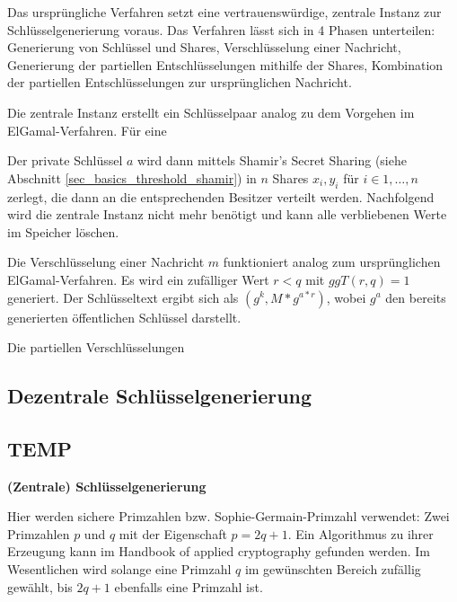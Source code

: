Das ursprüngliche Verfahren setzt eine vertrauenswürdige, zentrale Instanz zur Schlüsselgenerierung voraus. Das Verfahren lässt sich in 4 Phasen unterteilen: Generierung von Schlüssel und Shares, Verschlüsselung einer Nachricht, Generierung der partiellen Entschlüsselungen mithilfe der Shares, Kombination der partiellen Entschlüsselungen zur ursprünglichen Nachricht. 


Die zentrale Instanz erstellt ein Schlüsselpaar analog zu dem Vorgehen im ElGamal-Verfahren. Für eine 

Der private Schlüssel \(a\) wird dann mittels Shamir's Secret Sharing (siehe Abschnitt \ref{sec_basics_threshold_shamir}) in \(n\) Shares \(x_i, y_i\) für \(i \in {1, \dots, n}\) zerlegt, die dann an die entsprechenden Besitzer verteilt werden. Nachfolgend wird die zentrale Instanz nicht mehr benötigt und kann alle verbliebenen Werte im Speicher löschen.


Die Verschlüsselung einer Nachricht \(m\) funktioniert analog zum ursprünglichen ElGamal-Verfahren. Es wird ein zufälliger Wert \(r < q\) mit \(ggT(r,q) = 1\) generiert. Der Schlüsseltext ergibt sich als \((g^k, M * g^{a*r})\), wobei \(g^a\) den bereits generierten öffentlichen Schlüssel darstellt.


Die partiellen Verschlüsselungen 

\subsection{Dezentrale Schlüsselgenerierung}



\subsection{TEMP}


\textbf{(Zentrale) Schlüsselgenerierung }

Hier werden sichere Primzahlen bzw. Sophie-Germain-Primzahl verwendet: Zwei Primzahlen \(p\) und \(q\) mit der Eigenschaft \(p = 2q + 1\). Ein Algorithmus zu ihrer Erzeugung kann im Handbook of applied cryptography gefunden werden.  Im Wesentlichen wird solange eine Primzahl \(q\) im gewünschten Bereich zufällig gewählt, bis \(2q + 1\) ebenfalls eine Primzahl ist.

